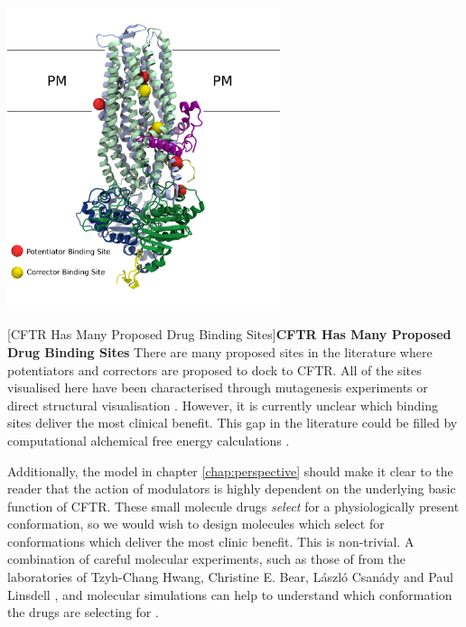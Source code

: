 \begin{center}
	\includegraphics[width=0.6\textwidth]{figures/many_drug_sites.pdf}
\end{center}
\begingroup
\captionsetup{singlelinecheck = false, justification=raggedright}
[CFTR Has Many Proposed Drug Binding Sites]{\textbf{CFTR Has Many Proposed Drug Binding Sites} {There are many proposed sites in the literature where potentiators and correctors are proposed to dock to CFTR. All of the sites visualised here have been characterised through mutagenesis experiments or direct structural visualisation \cite{yeh2019, laselva2021a, liu2019, baatallah2021}. However, it is currently unclear which binding sites deliver the most clinical benefit. This gap in the literature could be filled by computational alchemical free energy calculations \cite{jorgensen2008,chipot2007}. }}
\label{many_drug_bound_CFTR}
\endgroup


Additionally, the model in chapter \ref{chap:perspective} should make it clear to the reader that the action of modulators is highly dependent on the underlying basic function of CFTR. These small molecule drugs \textit{select} for a physiologically present conformation, so we would wish to design molecules which select for conformations which deliver the most clinic benefit. This is non-trivial. A combination of careful molecular experiments, such as those of from the laboratories of Tzyh-Chang Hwang,  Christine E. Bear, L\'aszl\'o Csan\'ady and Paul Linsdell \cite{linsdell2018, csanady2019, laselva2022, zhang2017b}, and molecular simulations can help to understand which conformation the drugs are selecting for \cite{laselva2021a}.

